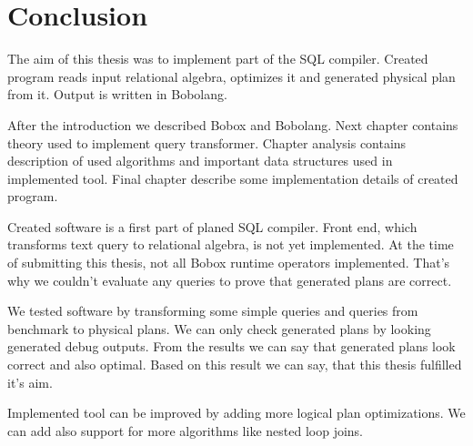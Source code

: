 \chapter{Conclusion}


The aim of this thesis was to implement part of the SQL compiler. Created program reads input relational algebra, optimizes it and generated physical plan from it. Output is written in Bobolang.

After the introduction we described Bobox and Bobolang. Next chapter contains theory used to implement query transformer. Chapter analysis contains description of used algorithms and important data structures used in implemented tool. Final chapter describe some implementation details of created program.

Created software is a first part of planed SQL compiler. Front end, which transforms text query to relational algebra, is not yet implemented. At the time of submitting this thesis, not all Bobox runtime operators implemented. That's why we couldn't evaluate any queries to prove that generated plans are correct.

We tested software by transforming some simple queries and queries from benchmark\cite{benchmark} to physical plans. We can only check generated plans by looking generated debug outputs. From the results we can say that generated plans look correct and also optimal. Based on this result we can say, that this thesis fulfilled it's aim. 


Implemented tool can be improved by adding more logical plan optimizations. We can add also support for more algorithms like nested loop joins.

